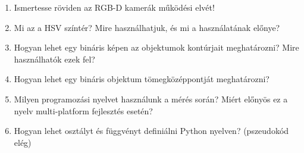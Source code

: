 \documentclass[12pt,a4paper,oneside]{report}             %
\begin{document}
\begin{enumerate}
\item Ismertesse röviden az RGB-D kamerák működési elvét!
\item Mi az a HSV színtér? Mire használhatjuk, és mi a használatának előnye?
\item Hogyan lehet egy bináris képen az objektumok kontúrjait meghatározni? Mire használhatók ezek fel?
\item Hogyan lehet egy bináris objektum tömegközéppontját meghatározni?
\item Milyen programozási nyelvet használunk a mérés során? Miért előnyös ez a nyelv multi-platform fejlesztés esetén?
\item Hogyan lehet osztályt és függvényt definiálni Python nyelven? (pszeudokód elég)
\end{enumerate}

\printbibliography
\end{document}

